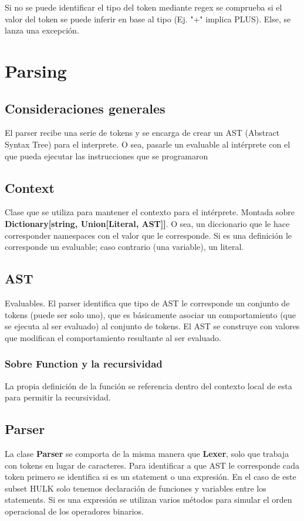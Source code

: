 \documentclass{report}
\begin{document}
Si no se puede identificar el tipo del token mediante regex se comprueba si el valor del token se puede inferir en base al tipo (Ej. "+" implica PLUS). Else, se lanza una excepción.

\chapter{Parsing}

\section{Consideraciones generales}
El parser recibe una serie de tokens y se encarga de crear un AST (Abstract Syntax Tree) para el interprete. O sea, pasarle un evaluable al intérprete con el que pueda ejecutar las instrucciones que se programaron

\section{Context}

Clase que se utiliza para mantener el contexto para el intérprete. Montada sobre \textbf{Dictionary[string, Union[Literal, AST]]}. O sea, un diccionario que le hace corresponder namespaces con el valor que le corresponde. Si es una definición le corresponde un evaluable; caso contrario (una variable), un literal.

\section{AST}
Evaluables. El parser identifica que tipo de AST le corresponde un conjunto de tokens (puede ser solo uno), que es básicamente asociar un comportamiento (que se ejecuta al ser evaluado) al conjunto de tokens.
El AST se construye con valores que modifican el comportamiento resultante al ser evaluado.

\subsection{Sobre Function y la recursividad}
La propia definición de la función se referencia dentro del contexto local de esta para permitir la recursividad.

\section{Parser}
La clase \textbf{Parser} se comporta de la misma manera que \textbf{Lexer}, solo que trabaja con tokens en lugar de caracteres.
Para identificar a que AST le corresponde cada token primero se identifica si es un statement o una expresión. En el caso de este subset HULK solo tenemos declaración de funciones y variables entre los statements.
Si es una expresión se utilizan varios métodos para simular el orden operacional de los operadores binarios.
\end{document}
